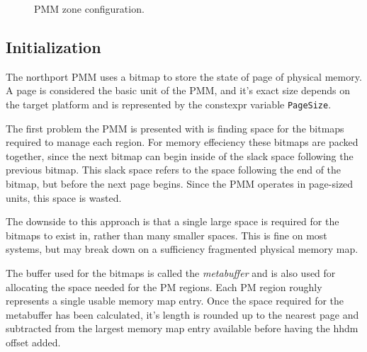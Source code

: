 \begin{figure}[h]
\centering
{}
\caption{PMM zone configuration.}
\end{figure}

\subsection{Initialization}
The northport PMM uses a bitmap to store the state of page of physical memory. A page is considered the basic unit of the PMM, and it's exact size depends on the target platform and is represented by the constexpr variable \verb|PageSize|.

The first problem the PMM is presented with is finding space for the bitmaps required to manage each region. For memory effeciency these bitmaps are packed together, since the next bitmap can begin inside of the slack space following the previous bitmap. This slack space refers to the space following the end of the bitmap, but before the next page begins. Since the PMM operates in page-sized units, this space is wasted.

The downside to this approach is that a single large space is required for the bitmaps to exist in, rather than many smaller spaces. This is fine on most systems, but may break down on a sufficiency fragmented physical memory map.

The buffer used for the bitmaps is called the \textit{metabuffer} and is also used for allocating the space needed for the PM regions. Each PM region roughly represents a single usable memory map entry. Once the space required for the metabuffer has been calculated, it's length is rounded up to the nearest page and subtracted from the largest memory map entry available before having the hhdm offset added.

